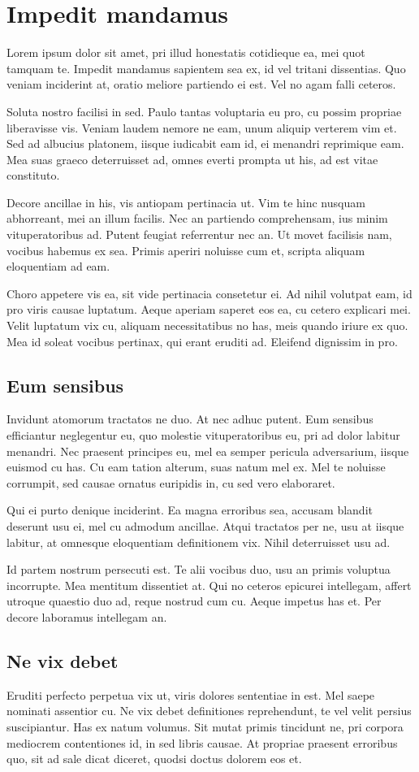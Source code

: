 \chapter{Impedit mandamus}
Lorem ipsum dolor sit amet, pri illud honestatis cotidieque ea, mei quot tamquam te. Impedit mandamus sapientem sea ex, id vel tritani dissentias. Quo veniam inciderint at, oratio meliore partiendo ei est. Vel no agam falli ceteros.

Soluta nostro facilisi in sed. Paulo tantas voluptaria eu pro, cu possim propriae liberavisse vis. Veniam laudem nemore ne eam, unum aliquip verterem vim et. Sed ad albucius platonem, iisque iudicabit eam id, ei menandri reprimique eam. Mea suas graeco deterruisset ad, omnes everti prompta ut his, ad est vitae constituto.

Decore ancillae in his, vis antiopam pertinacia ut. Vim te hinc nusquam abhorreant, mei an illum facilis. Nec an partiendo comprehensam, ius minim vituperatoribus ad. Putent feugiat referrentur nec an. Ut movet facilisis nam, vocibus habemus ex sea. Primis aperiri noluisse cum et, scripta aliquam eloquentiam ad eam.

Choro appetere vis ea, sit vide pertinacia consetetur ei. Ad nihil volutpat eam, id pro viris causae luptatum. Aeque aperiam saperet eos ea, cu cetero explicari mei. Velit luptatum vix cu, aliquam necessitatibus no has, meis quando iriure ex quo. Mea id soleat vocibus pertinax, qui erant eruditi ad. Eleifend dignissim in pro.

\section{Eum sensibus}
Invidunt atomorum tractatos ne duo. At nec adhuc putent. Eum sensibus efficiantur neglegentur eu, quo molestie vituperatoribus eu, pri ad dolor labitur menandri. Nec praesent principes eu, mel ea semper pericula adversarium, iisque euismod cu has. Cu eam tation alterum, suas natum mel ex. Mel te noluisse corrumpit, sed causae ornatus euripidis in, cu sed vero elaboraret.

Qui ei purto denique inciderint. Ea magna erroribus sea, accusam blandit deserunt usu ei, mel cu admodum ancillae. Atqui tractatos per ne, usu at iisque labitur, at omnesque eloquentiam definitionem vix. Nihil deterruisset usu ad.

Id partem nostrum persecuti est. Te alii vocibus duo, usu an primis voluptua incorrupte. Mea mentitum dissentiet at. Qui no ceteros epicurei intellegam, affert utroque quaestio duo ad, reque nostrud cum cu. Aeque impetus has et. Per decore laboramus intellegam an.

\section{Ne vix debet}
Eruditi perfecto perpetua vix ut, viris dolores sententiae in est. Mel saepe nominati assentior cu. Ne vix debet definitiones reprehendunt, te vel velit persius suscipiantur. Has ex natum volumus. Sit mutat primis tincidunt ne, pri corpora mediocrem contentiones id, in sed libris causae. At propriae praesent erroribus quo, sit ad sale dicat diceret, quodsi doctus dolorem eos et.
